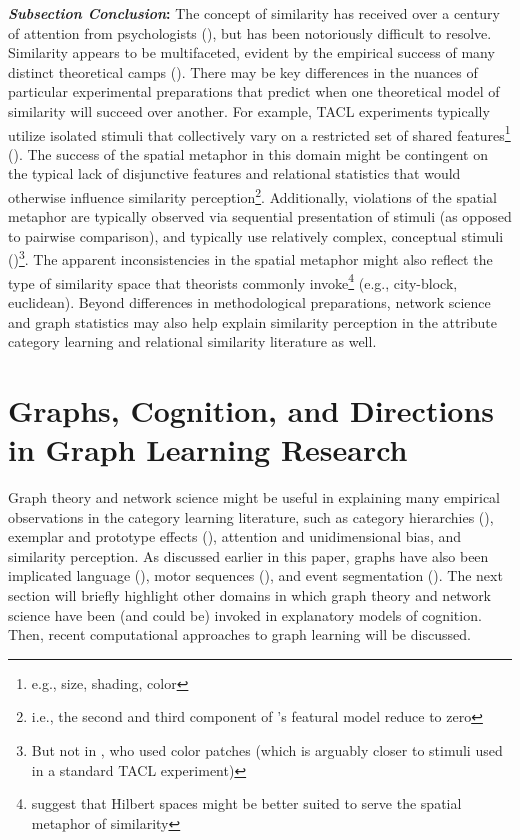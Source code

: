 \documentclass[12pt]{article}
\let\oldcite=\cite
\let\oldtextcite=\textcite
\renewcommand{\cite}[1]{\textcolor[rgb]{0, .121, .388}{\oldcite{#1}}}
\renewcommand{\textcite}[1]{\textcolor[rgb]{0, .121, .388}{\oldtextcite{#1}}}
\begin{document}
\textbf{\emph{Subsection Conclusion}:} The concept of similarity has received over a century of attention from psychologists (\cite{james1890principles,attneave1950dimensions,tversky1977features,goldstone2012similarity}), but has been notoriously difficult to resolve. Similarity appears to be multifaceted, evident by the empirical success of many distinct theoretical camps (\cite{shepard1987toward,nosofsky1994comparing,tversky1977features,goldstone1991relational}). There may be key differences in the nuances of particular experimental preparations that predict when one theoretical model of similarity will succeed over another. For example, TACL experiments typically utilize isolated stimuli that collectively vary on a restricted set of shared features\footnote{e.g., size, shading, color} (\cite{kurtz2015human,nosofsky1994comparing}). The success of the spatial metaphor in this domain might be contingent on the typical lack of disjunctive features and relational statistics that would otherwise influence similarity perception\footnote{i.e., the second and third component of \textcite{tversky1977features}'s featural model reduce to zero}. Additionally, violations of the spatial metaphor are typically observed via sequential presentation of stimuli (as opposed to pairwise comparison), and typically use relatively complex, conceptual stimuli (\cite{tversky1977features,holyoak1983social})\footnote{But not in \textcite{polk2002rating}, who used color patches (which is arguably closer to stimuli used in a standard TACL experiment)}. The apparent inconsistencies in the spatial metaphor might also reflect the type of similarity space that theorists commonly invoke\footnote{\textcite{jakel2008similarity} suggest that Hilbert spaces might be better suited to serve the spatial metaphor of similarity} (e.g., city-block, euclidean). Beyond differences in methodological preparations, network science and graph statistics may also help explain similarity perception in the attribute category learning and relational similarity literature as well. 


\section{Graphs, Cognition, and Directions in Graph Learning Research}
    
Graph theory and network science might be useful in explaining many empirical observations in the category learning literature, such as category hierarchies (\cite{mervis1981categorization}), exemplar and prototype effects (\cite{danks2014unifying}), attention and unidimensional bias, and similarity perception. As discussed earlier in this paper, graphs have also been implicated language (\cite{vitevitch2008can,chan2009influence,chan2010network,vitevitch2012complex}), motor sequences (\cite{kahn2018network}), and event segmentation (\cite{karuza2017process,karuza2019human}). The next section will briefly highlight other domains in which graph theory and network science have been (and could be) invoked in explanatory models of cognition. Then, recent computational approaches to graph learning will be discussed.
\end{document}
